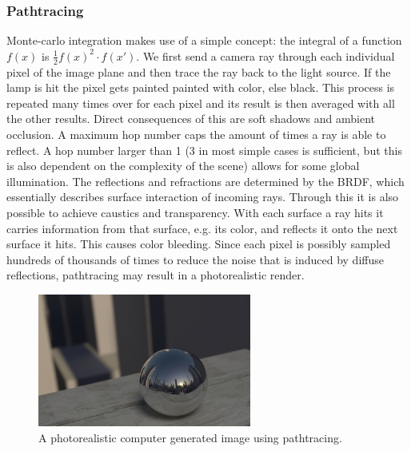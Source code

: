\documentclass{ACGSeminar}
\begin{document}
	\subsubsection{Pathtracing} 
		Monte-carlo integration makes use of a simple concept: the integral of a function $f(x)$ is $\frac{1}{2}f(x)^2 \cdot f(x')$. We first send a camera ray through each individual pixel of the image plane and then trace the ray back to the light source. If the lamp is hit the pixel gets painted painted with color, else black. This process is repeated many times over for each pixel and its result is then averaged with all the other results. Direct consequences of this are soft shadows and ambient occlusion. A maximum hop number caps the amount of times a ray is able to reflect. A hop number larger than 1 (3 in most simple cases is sufficient, but this is also dependent on the complexity of the scene) allows for some global illumination. The reflections and refractions are determined by the BRDF, which essentially describes surface interaction of incoming rays. Through this it is also possible to achieve caustics and transparency. With each surface a ray hits it carries information from that surface, e.g. its color, and reflects it onto the next surface it hits. This causes color bleeding. Since each pixel is possibly sampled hundreds of thousands of times to reduce the noise that is induced by diffuse reflections, pathtracing may result in a photorealistic render.
		\begin{figure}[htb!]%
			\begin{center}%
				\includegraphics[width=7cm]{img/pathtracing.png}
			\end{center}%
			\caption{A photorealistic computer generated image using pathtracing.}%
			\label{fig:pathtracing}%
		\end{figure}%
\end{document}
